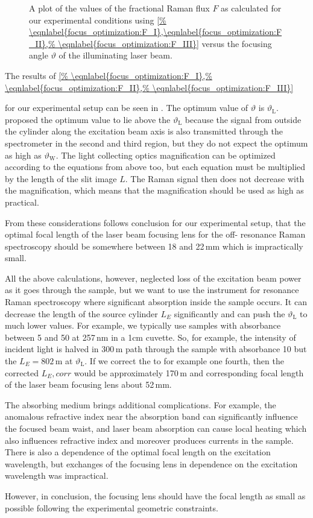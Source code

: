 \begin{figure}
	\centering
	
	\caption{A plot of the values of the fractional Raman flux $F$ as calculated
	for our experimental conditions using \cref{%
		\eqnlabel{focus_optimization:F_I},\eqnlabel{focus_optimization:F_II},%
		\eqnlabel{focus_optimization:F_III}}
	versus the focusing angle $\vartheta$ of the
	illuminating laser beam.}
	\label{\figlabel{focus_optimization:F}}
\end{figure}

The results of \cref{%
		\eqnlabel{focus_optimization:F_I},%
		\eqnlabel{focus_optimization:F_II},%
		\eqnlabel{focus_optimization:F_III}}

for our experimental setup can be seen in . The
optimum value of $\vartheta$ is $\vartheta_\text{L}$. \textcite{Barrett1968}
proposed the optimum value to lie above the $\vartheta_\text{L}$ because the
signal from outside the cylinder along the excitation beam axis is also
transmitted through the spectrometer in the second and third region, but they
do not expect the optimum as high as $\vartheta_\text{W}$. The light
collecting optics magnification can be optimized according to the equations
from above too, but each equation must be multiplied by the length of the
slit image $L$. The Raman signal then does not decrease with the
magnification, which means that the magnification should be used as high as
practical.

From these considerations follows conclusion for our experimental setup, that
the optimal focal length of the laser beam focusing lens for the off-
resonance Raman spectroscopy should be somewhere between 18 and 22\,mm which
is impractically small.

All the above calculations, however, neglected loss of the excitation beam
power as it goes through the sample, but we want to use the instrument for
resonance Raman spectroscopy where significant absorption inside the sample
occurs. It can decrease the length of the source cylinder $L_E$ significantly
and can push the $\vartheta_\text{L}$ to much lower values. For example, we
typically use samples with absorbance between 5 and 50 at 257\,nm in a 1cm
cuvette. So, for example, the intensity of incident light is halved in
300\,m path through the sample with absorbance 10 but the
$L_E = 802$\,m at $\vartheta_\text{L}$. If we correct the
 to for example one fourth, then the
corrected $L_E,corr$ would be approximately 170\,m and corresponding
focal length of the laser beam focusing lens about 52\,mm.

The absorbing medium brings additional complications. For example, the
anomalous refractive index near the absorption band can significantly
influence the focused beam waist, and laser beam absorption can cause local
heating which also influences refractive index and moreover produces currents
in the sample. There is also a dependence of the optimal focal length on the
excitation wavelength, but exchanges of the focusing lens in dependence on
the excitation wavelength was impractical.

However, in conclusion, the focusing lens should have the focal length as
small as possible following the experimental geometric constraints.

